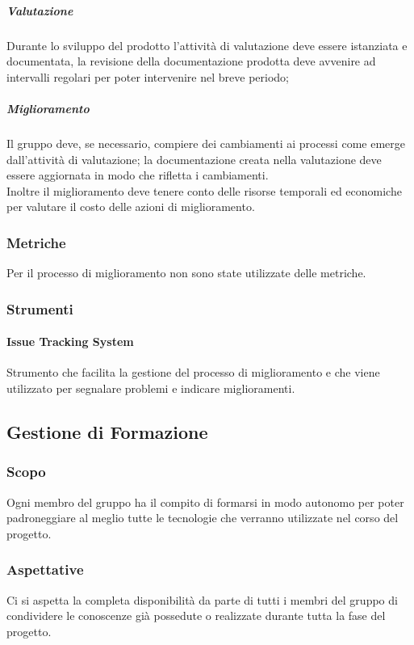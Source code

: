 \subparagraph*{Valutazione} 
Durante lo sviluppo del prodotto l'attività di valutazione deve essere istanziata e documentata, la revisione della documentazione prodotta deve avvenire ad intervalli regolari per poter intervenire nel breve periodo;

\subparagraph*{Miglioramento} 
Il gruppo deve, se necessario, compiere dei cambiamenti ai processi come emerge dall'attività di valutazione; la documentazione creata nella valutazione deve essere aggiornata in modo che rifletta i cambiamenti.\\
Inoltre il miglioramento deve tenere conto delle risorse temporali ed economiche per valutare il costo delle azioni di miglioramento.

\subsubsection{Metriche} 
Per il processo di miglioramento non sono state utilizzate delle metriche.

\subsubsection{Strumenti} 
\paragraph{Issue Tracking System} 
Strumento che facilita la gestione del processo di miglioramento e che viene utilizzato per segnalare problemi e indicare miglioramenti.


\newpage

\subsection{Gestione di Formazione}
\subsubsection{Scopo}
Ogni membro del gruppo ha il compito di formarsi in modo autonomo per poter padroneggiare al meglio tutte le tecnologie che verranno utilizzate nel corso del progetto.


\subsubsection{Aspettative}
Ci si aspetta la completa disponibilità da parte di tutti i membri del gruppo di condividere le conoscenze già possedute o realizzate durante tutta la fase del progetto.

